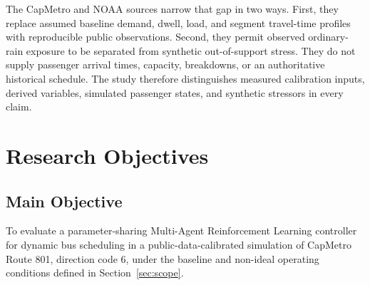 The CapMetro and NOAA sources narrow that gap in two ways. First, they replace assumed baseline demand, dwell, load, and segment travel-time profiles with reproducible public observations. Second, they permit observed ordinary-rain exposure to be separated from synthetic out-of-support stress. They do not supply passenger arrival times, capacity, breakdowns, or an authoritative historical schedule. The study therefore distinguishes measured calibration inputs, derived variables, simulated passenger states, and synthetic stressors in every claim.

\section{Research Objectives}

\subsection{Main Objective}

To evaluate a parameter-sharing Multi-Agent Reinforcement Learning controller for dynamic bus scheduling in a public-data-calibrated simulation of CapMetro Route 801, direction code 6, under the baseline and non-ideal operating conditions defined in Section~\ref{sec:scope}.

